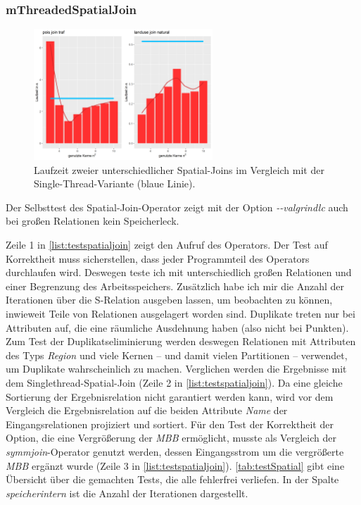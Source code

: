 \documentclass[a4paper,12pt,twoside]{article}
\newcommand{\Fb}[1]{\textit{#1}} %
\begin{document}
\subsubsection{mThreadedSpatialJoin}

\begin{figure}
	\centering
	\includegraphics[width=0.60\textwidth]{Bilder/sj_kerne.png}
	\caption{Laufzeit zweier unterschiedlicher Spatial-Joins im Vergleich mit der Single-Thread-Variante (blaue Linie).}
	\label{img:sjKern}
\end{figure}

Der Selbsttest des Spatial-Join-Operator zeigt mit der Option \Fb{-{}-valgrindlc} auch bei großen Relationen kein Speicherleck.

Zeile 1 in \autoref{list:testspatialjoin} zeigt den Aufruf des Operators. Der Test auf Korrektheit muss sicherstellen, dass jeder Programmteil des Operators durchlaufen wird. Deswegen teste ich mit unterschiedlich großen Relationen und einer Begrenzung des Arbeitsspeichers. Zusätzlich habe ich mir die Anzahl der Iterationen über die S-Relation ausgeben lassen, um beobachten zu können, inwieweit Teile von Relationen ausgelagert worden sind. Duplikate treten nur bei Attributen auf, die eine räumliche Ausdehnung haben (also nicht bei Punkten). Zum Test der Duplikatseliminierung werden deswegen Relationen mit Attributen des Typs \Fb{Region} und viele Kernen -- und damit vielen Partitionen -- verwendet, um Duplikate wahrscheinlich zu machen. Verglichen werden die Ergebnisse mit dem Singlethread-Spatial-Join (Zeile 2 in \autoref{list:testspatialjoin}). Da eine gleiche Sortierung der Ergebnisrelation nicht garantiert werden kann, wird vor dem Vergleich die Ergebnisrelation auf die beiden Attribute \Fb{Name} der Eingangsrelationen projiziert und sortiert. Für den Test der Korrektheit der Option, die eine Vergrößerung der \Fb{MBB} ermöglicht, musste als Vergleich der \Fb{symmjoin}-Operator genutzt werden, dessen Eingangsstrom um die vergrößerte \Fb{MBB} ergänzt wurde (Zeile 3 in \autoref{list:testspatialjoin}). \autoref{tab:testSpatial} gibt eine Übersicht über die gemachten Tests, die alle fehlerfrei verliefen. In der Spalte \Fb{speicherintern} ist die Anzahl der Iterationen dargestellt. 
\end{document}
